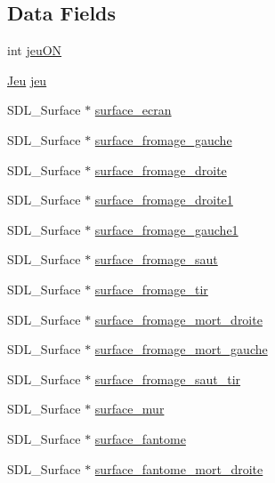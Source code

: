 \subsection*{Data Fields}
\begin{DoxyCompactItemize}
\item 
int \hyperlink{structsdl_jeu_a52e5e34765d5dbac15d959dbaddf4e5e}{jeu\-O\-N}
\item 
\hyperlink{struct_jeu}{Jeu} \hyperlink{structsdl_jeu_a56ca1ac56f66324ba9bc5868128ddb84}{jeu}
\item 
S\-D\-L\-\_\-\-Surface $\ast$ \hyperlink{structsdl_jeu_a3970583cd7133d59e68d97fc4023ab99}{surface\-\_\-ecran}
\item 
S\-D\-L\-\_\-\-Surface $\ast$ \hyperlink{structsdl_jeu_afd00ed4bfd7c3861399353daf3448bdf}{surface\-\_\-fromage\-\_\-gauche}
\item 
S\-D\-L\-\_\-\-Surface $\ast$ \hyperlink{structsdl_jeu_a7c6ef35a42794f835aa8b46035ee47fa}{surface\-\_\-fromage\-\_\-droite}
\item 
S\-D\-L\-\_\-\-Surface $\ast$ \hyperlink{structsdl_jeu_a71c9d3841b956efd1679703045750d21}{surface\-\_\-fromage\-\_\-droite1}
\item 
S\-D\-L\-\_\-\-Surface $\ast$ \hyperlink{structsdl_jeu_adfb16227a11193bf81b7781d3e39589a}{surface\-\_\-fromage\-\_\-gauche1}
\item 
S\-D\-L\-\_\-\-Surface $\ast$ \hyperlink{structsdl_jeu_abfef78dde33045acb50cc005888ef184}{surface\-\_\-fromage\-\_\-saut}
\item 
S\-D\-L\-\_\-\-Surface $\ast$ \hyperlink{structsdl_jeu_a4725423b3638295a6ecc002c96826235}{surface\-\_\-fromage\-\_\-tir}
\item 
S\-D\-L\-\_\-\-Surface $\ast$ \hyperlink{structsdl_jeu_ae7b0c7c4f3c21bed15109564ca380a64}{surface\-\_\-fromage\-\_\-mort\-\_\-droite}
\item 
S\-D\-L\-\_\-\-Surface $\ast$ \hyperlink{structsdl_jeu_ab0f132d65433e47f88112b705dc1b3cb}{surface\-\_\-fromage\-\_\-mort\-\_\-gauche}
\item 
S\-D\-L\-\_\-\-Surface $\ast$ \hyperlink{structsdl_jeu_af661b67f0b78d8093091c652a6bc0bbc}{surface\-\_\-fromage\-\_\-saut\-\_\-tir}
\item 
S\-D\-L\-\_\-\-Surface $\ast$ \hyperlink{structsdl_jeu_a1eae6cdffcfd9a581314a0377e25b825}{surface\-\_\-mur}
\item 
S\-D\-L\-\_\-\-Surface $\ast$ \hyperlink{structsdl_jeu_afff984367bbdf019fda00ae1d3e8a8d6}{surface\-\_\-fantome}
\item 
S\-D\-L\-\_\-\-Surface $\ast$ \hyperlink{structsdl_jeu_a63e27a4ffca9b9d744f1c59ccceccfee}{surface\-\_\-fantome\-\_\-mort\-\_\-droite}

\end{DoxyCompactItemize}
